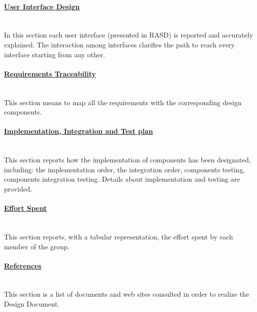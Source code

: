 \paragraph{\hyperref[sect:userInterfaceDesign]{User	 Interface Design}}\mbox{}\\
In this section each user interface (presented in RASD) is reported and accurately explained. The interaction among interfaces clarifies the path to reach every interface starting from any other. 
\paragraph{\hyperref[sect:requirementsTraceability]{Requirements Traceability}}\mbox{}\\
This section means to map all the requirements with the corresponding design components. 
\paragraph{\hyperref[sect:implementationIntegrationTestplan]{Implementation, Integration and Test plan}}\mbox{}\\
This section reports how the implementation of components has been designated, including: the implementation order, the integration order, components testing, components integration testing. Details about implementation and testing are provided.  
\paragraph{\hyperref[sect:effort]{Effort Spent}}\mbox{}\\
This section reports, with a tabular representation, the effort spent by each member of the group. 
\paragraph{\hyperref[sect:references]{References}}\mbox{}\\
This section is a list of documents and web sites consulted in order to realize the Design Document. 



